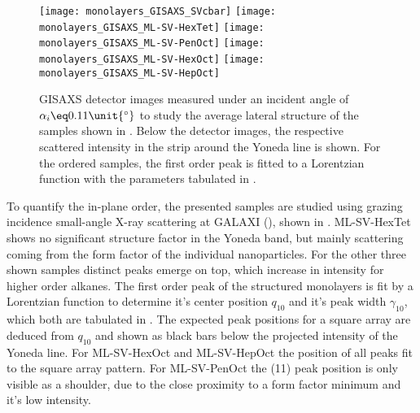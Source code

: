 \documentclass[\main/dresen_thesis.tex]{subfiles}
\begin{document}
    \begin{figure}[tb]
      \centering
      \texttt{[image: monolayers\_GISAXS\_SVcbar]}
      \texttt{[image: monolayers\_GISAXS\_ML-SV-HexTet]}
      \texttt{[image: monolayers\_GISAXS\_ML-SV-PenOct]}
      \texttt{[image: monolayers\_GISAXS\_ML-SV-HexOct]}
      \texttt{[image: monolayers\_GISAXS\_ML-SV-HepOct]}
      \caption{\label{fig:monolayers:preparation:solventVariation:gisaxs}GISAXS detector images measured under an incident angle of $\alpha_i \eq 0.11 \unit{^\circ}$ to study the average lateral structure of the samples shown in . Below the detector images, the respective scattered intensity in the strip around the Yoneda line is shown. For the ordered samples, the first order peak is fitted to a Lorentzian function with the parameters tabulated in .}
    \end{figure}

    To quantify the in-plane order, the presented samples are studied using grazing incidence small-angle X-ray scattering at GALAXI (), shown in .
    ML-SV-HexTet shows no significant structure factor in the Yoneda band, but mainly scattering coming from the form factor of the individual nanoparticles.
    For the other three shown samples distinct peaks emerge on top, which increase in intensity for higher order alkanes.
    The first order peak of the structured monolayers is fit by a Lorentzian function to determine it's center position  $q_{10}$ and it's peak width $\gamma_{10}$, which both are tabulated in .
    The expected peak positions for a square array are deduced from $q_{10}$ and shown as black bars below the projected intensity of the Yoneda line.
    For ML-SV-HexOct and ML-SV-HepOct the position of all peaks fit to the square array pattern.
    For ML-SV-PenOct the (11) peak position is only visible as a shoulder, due to the close proximity to a form factor minimum and it's low intensity.
\end{document}
